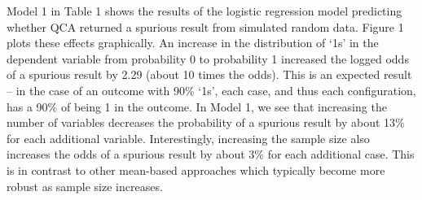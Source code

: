 \documentclass[12pt]{article}
\begin{document}
{{{{Model 1 in Table 1 shows the results of the logistic regression model predicting whether QCA returned a spurious result from simulated random data. Figure 1 plots these effects graphically. An increase in the distribution of `1s' in the dependent variable from probability 0 to probability 1 increased the logged odds of a spurious result by 2.29 (about 10 times the odds). This is an expected result -- in the case of an outcome with 90\% `1s', each case, and thus each configuration, has a 90\% of being 1 in the outcome. In Model 1, we see that increasing the number of variables decreases the probability of a spurious result by about 13\% for each additional variable. Interestingly, increasing the sample size also increases the odds of a spurious result by about 3\% for each additional case. This is in contrast to other mean-based approaches which typically become more robust as sample size increases.

}}}}
\end{document}
